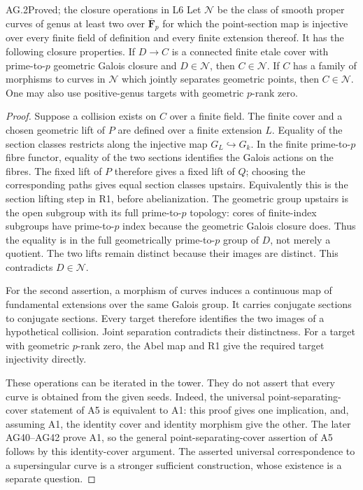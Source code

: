 \begin{claim}{AG.2}{Proved; the closure operations in L6}
Let $\mathcal N$ be the class of smooth proper curves of genus at
least two over $\overline{\mathbf F}_p$ for which the point-section
map is injective over every finite field of definition and every
finite extension thereof. It has the following closure properties.
If $D\to C$ is a connected finite etale cover with prime-to-$p$
geometric Galois closure and $D\in\mathcal N$, then
$C\in\mathcal N$. If $C$ has a family of morphisms to curves
in $\mathcal N$ which jointly separates geometric points, then
$C\in\mathcal N$. One may also use positive-genus targets
with geometric $p$-rank zero.
\end{claim}
\begin{proof}
Suppose a collision exists on $C$ over a finite field. The finite
cover and a chosen geometric lift of $P$ are defined over a finite
extension $L$. Equality of the section classes restricts along
the injective map $G_L\hookrightarrow G_k$. In the finite
prime-to-$p$ fibre functor, equality of the two sections identifies
the Galois actions on the fibres. The fixed lift of $P$ therefore
gives a fixed lift of $Q$; choosing the corresponding paths gives
equal section classes upstairs. Equivalently this is the section
lifting step in R1, before abelianization. The geometric group
upstairs is the open subgroup with its full prime-to-$p$ topology:
cores of finite-index subgroups have prime-to-$p$ index because
the geometric Galois closure does. Thus the equality is in the
full geometrically prime-to-$p$ group of $D$, not merely a
quotient. The two lifts remain distinct because their images are
distinct. This contradicts $D\in\mathcal N$.

For the second assertion, a morphism of curves induces a
continuous map of fundamental extensions over the same Galois
group. It carries conjugate sections to conjugate sections.
Every target therefore identifies the two images of a hypothetical
collision. Joint separation contradicts their distinctness.
For a target with geometric $p$-rank zero, the Abel map and R1
give the required target injectivity directly.

These operations can be iterated in the tower. They do not
assert that every curve is obtained from the given seeds.
Indeed, the universal point-separating-cover statement of A5 is
equivalent to A1: this proof gives one implication, and, assuming
A1, the identity cover and identity morphism give the other.
The later AG40--AG42 prove A1, so the general
point-separating-cover assertion of A5 follows by this
identity-cover argument. The asserted universal correspondence
to a supersingular curve is a stronger sufficient construction,
whose existence is a separate question.
\end{proof}


